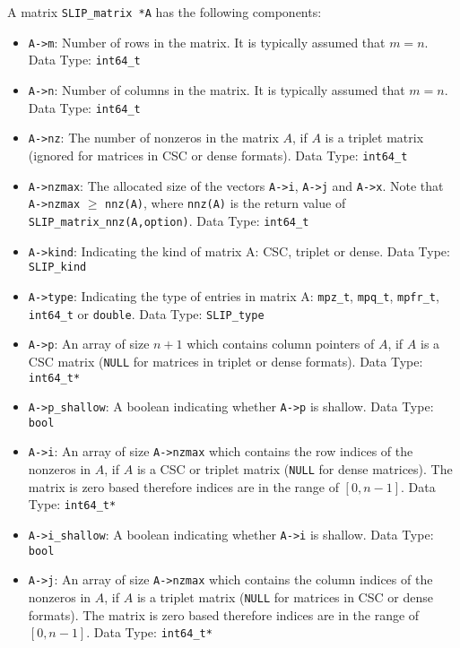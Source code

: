\documentclass[12pt]{article}
\theoremstyle{definition}
\begin{document}
A matrix \verb|SLIP_matrix *A| has the following components:

\begin{itemize}
\item \verb|A->m|: Number of rows in the matrix. It is typically assumed that
$m=n$.  Data Type: \verb|int64_t|

\item \verb|A->n|: Number of columns in the matrix. It is typically assumed
that $m=n$. Data Type: \verb|int64_t|

\item \verb|A->nz|: The number of nonzeros in the matrix $A$, if $A$ is
a triplet matrix (ignored for matrices in CSC or dense formats). Data Type:
\verb|int64_t|

\item \verb|A->nzmax|: The allocated size of the vectors \verb|A->i|, \verb|A->j| and \verb|A->x|. Note that \verb|A->nzmax| $\geq$ \verb|nnz(A)|, where
\verb'nnz(A)' is the return value of \verb'SLIP_matrix_nnz(A,option)'.
Data Type: \verb|int64_t|

\item \verb|A->kind|: Indicating the kind of matrix A: CSC, triplet or dense.
Data Type: \verb|SLIP_kind|

\item \verb|A->type|: Indicating the type of entries in matrix A: \verb|mpz_t|,
\verb|mpq_t|, \verb|mpfr_t|, \verb|int64_t| or \verb|double|.
Data Type: \verb|SLIP_type|

\item \verb|A->p|: An array of size $n+1$ which contains column pointers
of $A$, if $A$ is a CSC matrix (\verb|NULL| for matrices in triplet or dense
formats). Data Type: \verb|int64_t*|

\item \verb|A->p_shallow|: A boolean indicating whether \verb|A->p| is shallow.
Data Type: \verb|bool|

\item \verb|A->i|: An array of size \verb|A->nzmax| which contains the row
indices of the nonzeros in $A$, if $A$ is a CSC or triplet matrix (\verb|NULL|
for dense matrices). The matrix is zero based therefore indices are
in the range of $[0, n-1]$. Data Type: \verb|int64_t*|

\item \verb|A->i_shallow|: A boolean indicating whether \verb|A->i| is shallow.
Data Type: \verb|bool|

\item \verb|A->j|: An array of size \verb|A->nzmax| which contains the column
indices of the nonzeros in $A$, if $A$ is a triplet matrix (\verb|NULL| for
matrices in CSC or dense formats).
The matrix is zero based therefore indices are
in the range of $[0, n-1]$. Data Type: \verb|int64_t*|


\end{itemize}
\end{document}
